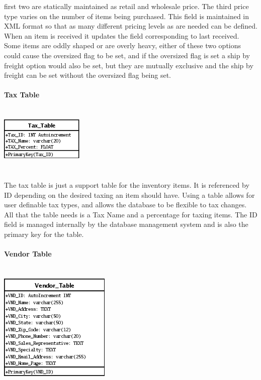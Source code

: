 \documentclass{report}
\begin{document}
\begin{itemize}
        first two are statically maintained as retail and wholesale price. The third price
        type varies on the number of items being purchased. This field is maintained in XML
        format so that as many different pricing levels as are needed can be defined. When an
        item is received it updates the field corresponding to last received. Some items are
        oddly shaped or are overly heavy, either of these two options could cause the oversized
        flag to be set, and if the oversized flag is set a ship by freight option would also be
        set, but they are mutually exclusive and the ship by freight can be set without the
        oversized flag being set.\\
        \\
        {\bf Tax Table}\\
        \\
        \\
        \includegraphics{Tables/TaxTable.png}\\
        \\
        \\
        The tax table is just a support table for the inventory items. It is referenced by ID
        depending on the desired taxing an item should have. Using a table allows for user definable
        tax types, and allows the database to be flexible to tax changes. All that the table needs
        is a Tax Name and a percentage for taxing items. The ID field is managed internally by the
        database management system and is also the primary key for the table.\\
        \\
        {\bf Vendor Table}\\
        \\
        \\
        \includegraphics{Tables/VendorTable.png}\\

\end{itemize}
\end{document}
